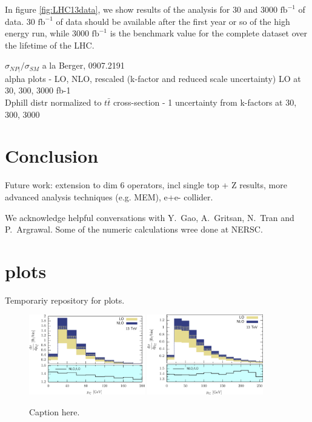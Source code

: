 \documentclass[preprint]{JHEP3} %
\def\invfb {\mathrm{fb}^{-1}}
\begin{document}
In figure \ref{fig:LHC13data}, we show results of the analysis for 30 and 3000 $\invfb$ of data. 30 $\invfb$ of data should be available after the first year or so of the high energy run, while 3000 $\invfb$ is the benchmark value for the complete dataset over the lifetime of the LHC. 

$\sigma_{NP|} / \sigma_{SM}$ a la Berger, 0907.2191 \\

alpha plots - LO, NLO, rescaled (k-factor and reduced scale uncertainty) LO at 30, 300, 3000 fb-1\\
Dphill distr normalized to $t\bar{t}$ cross-section  - 1 uncertainty from k-factors at 30, 300, 3000\\

\section{Conclusion}
Future work: extension to dim 6 operators, incl single top + Z results, more advanced analysis techniques (e.g. MEM), e+e- collider.
%


\acknowledgments
We acknowledge helpful conversations with Y.~Gao, A.~Gritsan, N.~Tran and P.~Argrawal. 
Some of the numeric calculations wree done at NERSC.


\appendix
\section{plots}
Temporariy repository for plots.


\begin{figure}[h]
\centering %
\includegraphics[width=0.45\textwidth]{./LHC_53_Fig01.eps}
\hfill
\includegraphics[width=0.45\textwidth]{./LHC_53_Fig03.eps}
\caption{\label{fig:i} Caption here.}
\end{figure}
\end{document}
